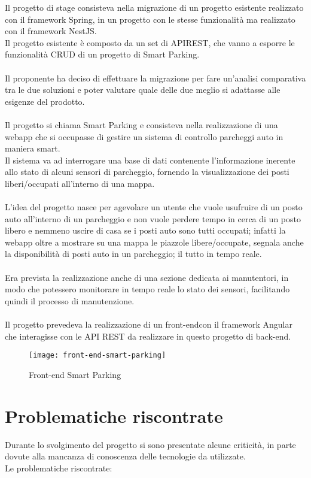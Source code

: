 Il progetto di stage consisteva nella migrazione di un progetto esistente realizzato con il framework
Spring, in un progetto con le stesse funzionalità ma realizzato con il framework NestJS.
\\
Il progetto esistente è composto da un set di
\gls{API}\glsfirstoccur \gls{REST}\glsfirstoccur, che vanno a esporre le funzionalità \gls{CRUD}
di un progetto di Smart Parking. 
\\\\
Il proponente ha deciso di effettuare 
la migrazione per fare un'analisi comparativa tra le due soluzioni
e poter valutare quale delle due meglio si adattasse alle esigenze
del prodotto.
\\\\
Il progetto si chiama Smart Parking e consisteva nella realizzazione di una webapp che si occupasse di gestire un sistema
di controllo parcheggi auto in maniera smart. 
\\
Il sistema va ad interrogare una base di dati contenente
l'informazione inerente allo stato di alcuni sensori di parcheggio, fornendo la visualizzazione
dei posti liberi/occupati all'interno di una mappa.
\\\\
L'idea del progetto nasce per agevolare un utente che vuole usufruire di un posto auto all'interno di 
un parcheggio e non vuole perdere tempo in cerca di un posto libero e nemmeno uscire di casa se i posti auto
sono tutti occupati; infatti la webapp oltre a mostrare su una mappa le piazzole libere/occupate, segnala 
anche la disponibilità di posti auto in un parcheggio; il tutto in tempo reale.
\\\\
Era prevista la realizzazione anche di una sezione dedicata ai manutentori, in modo che potessero monitorare
in tempo reale lo stato dei sensori, facilitando quindi il processo di manutenzione.
\\\\
Il progetto prevedeva la realizzazione di un \gls{front-end}\glsfirstoccur con il framework Angular che interagisse 
con le \gls{API} \gls{REST} da realizzare in questo progetto di 
\gls{back-end}\glsfirstoccur.
\clearpage
\begin{figure}[H]
    \centering
    \texttt{[image: front-end-smart-parking]}
    \caption{Front-end Smart Parking}
\end{figure}

\section{Problematiche riscontrate}
Durante lo svolgimento del progetto si sono presentate alcune criticità, in parte dovute alla mancanza
di conoscenza delle tecnologie da utilizzate. 
\\
Le problematiche riscontrate:

